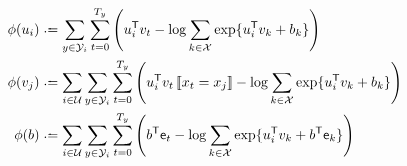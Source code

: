 \documentclass{article}
\def\e{\ensuremath{\mathsf{e}}}
\def\U{\ensuremath{\mathcal{U}}}
\begin{document}
\begin{align}
\phi(u_i) &\defeq   \sum_{y \in \Y_i} \sum_{t=0}^{T_y} \left( u_i\trans v_t - \log \sum_{k\in \X} \exp\{u_i\trans v_k + b_k\} \right)\\
\phi(v_j) &\defeq   \sum_{i \in \U} \sum_{y \in \Y_i} \sum_{t=0}^{T_y} \left( u_i\trans v_t \ind{x_t = x_j} - \log \sum_{k\in \X} \exp\{u_i\trans v_k + b_k\} \right)\\
\phi(b)   &\defeq   \sum_{i\in\U}\sum_{y\in\Y_i}\sum_{t=0}^{T_y} \left( b\trans \e_t - \log \sum_{k\in \X} \exp\{u_i\trans v_k + b\trans \e_k\} \right)
\end{align}
\end{document}
